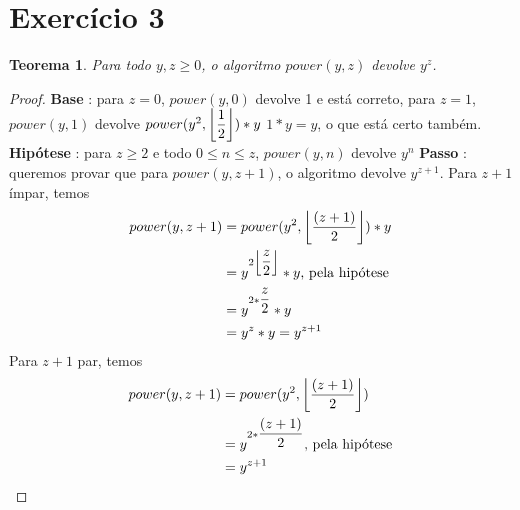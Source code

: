 \documentclass{article}
\DeclarePairedDelimiter\floor{\lfloor}{\rfloor}
\begin{document}
\section{Exercício 3}
\newtheorem{teo3}{Teorema}
\begin{teo3}
	Para todo $y,z \geq 0$, o algoritmo $power(y,z)$ devolve $y^z$.
\end{teo3}
\begin{proof}
	\hfill \break
	\textbf{Base} : para $z = 0$, $power(y, 0)$ devolve 1 e está correto,\newline
	\hspace*{30pt} para $z = 1$, $power(y, 1)$ devolve\newline
	\hspace*{30pt} $power(y^2, \floor*{\dfrac{1}{2}})*y$ \newline
	\hspace*{30pt} $1*y = y$, o que está certo também.\newline
	\newline
	\textbf{Hipótese} : para $z \geq 2$ e todo $0 \leq n \leq z$, $power(y,n)$ devolve $y^n$\newline
	\textbf{Passo} : queremos provar que para $power(y,z+1)$, o algoritmo devolve $y^{z+1}$.\newline	
	\hspace*{30pt} Para $z+1$ ímpar, temos
	\begin{equation}
		\begin{split}
		power(y, z+1) & = power(y^2, \floor*{\dfrac{(z+1)}{2}})*y\\
		& = y^{2\floor*{\dfrac{z}{2}}}*y\text{, pela hipótese}\\
		& = y^{2*\dfrac{z}{2}}*y\\
		& = y^z*y = y^{z+1}
		\end{split}
	\end{equation}
	\hspace*{30pt} Para $z+1$ par, temos
	\begin{equation}
		\begin{split}
		power(y, z+1) & = power(y^2, \floor*{\dfrac{(z+1)}{2}})\\
		& = y^{2*\dfrac{(z+1)}{2}}\text{, pela hipótese} \\
		& = y^{z+1}
		\end{split}
	\end{equation}
\end{proof}
\end{document}

